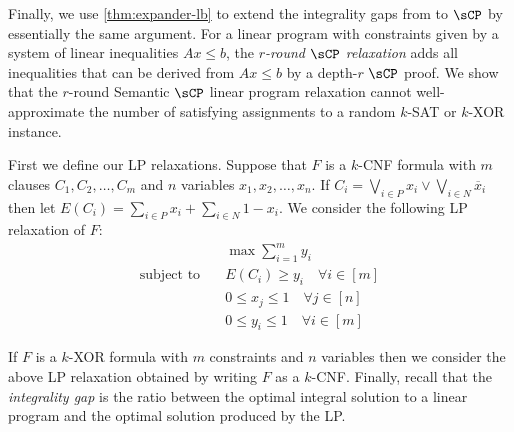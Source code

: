 \documentclass{toc}
\begin{document}
Finally, we use \autoref{thm:expander-lb} to extend the integrality gaps from \cite{BGHMP06} to $\sCP$ by essentially the same argument. 
For a linear program with constraints given by a system of linear inequalities $Ax \leq b$, the \emph{$r$-round $\sCP$ relaxation} adds all inequalities that can be derived from $Ax \leq b$ by a depth-$r$ $\sCP$ proof.
We show that the $r$-round Semantic $\sCP$ linear program relaxation cannot well-approximate the number of satisfying assignments to a random $k$-SAT or $k$-XOR instance. 

First we define our LP relaxations.
Suppose that $F$ is a $k$-CNF formula with $m$ clauses $C_1, C_2, \ldots, C_m$ and $n$ variables $x_1, x_2, \ldots, x_n$.
If $C_i = \bigvee_{i \in P} x_i \vee \bigvee_{i \in N} \overline x_i$ then let $E(C_i) = \sum_{i \in P} x_i + \sum_{i \in N} 1-x_i$.
We consider the following LP relaxation of $F$:
\begin{align*}
	& \max \sum_{i=1}^m y_i \\
	\text{subject to}\quad & E(C_i) \geq y_i \quad \forall i \in [m]\\
	& 0 \leq x_j \leq 1 \quad \forall j \in [n] \\
	& 0 \leq y_i \leq 1 \quad \forall i \in [m]
\end{align*}

If $F$ is a $k$-XOR formula with $m$ constraints and $n$ variables then we consider the above LP relaxation obtained by writing $F$ as a $k$-CNF.
Finally, recall that the \emph{integrality gap} is the ratio between the optimal integral solution to a linear program and the optimal solution produced by the LP. 
\end{document}
